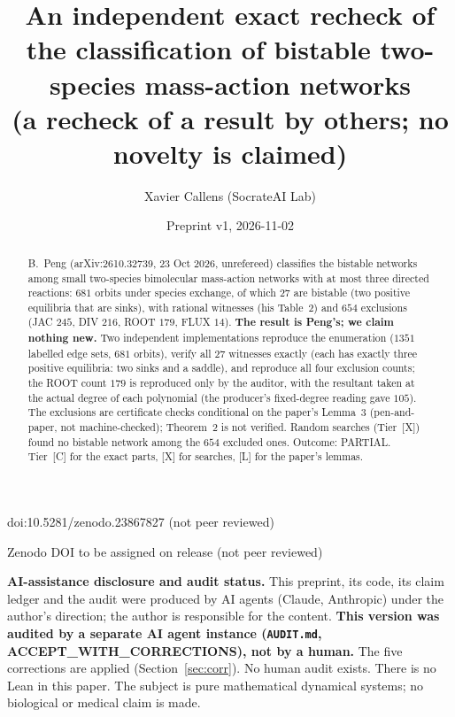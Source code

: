 \documentclass[10pt]{article}
\title{An independent exact recheck of the classification of bistable two-species mass-action networks\\
{\large (a recheck of a result by others; no novelty is claimed)}}
\author{Xavier Callens (SocrateAI Lab)}
\date{Preprint v1, 2026-11-02}
\newcommand{\tier}[1]{\textsf{[#1]}}
\newcommand{\tL}{\tier{L}}
\newcommand{\tC}{\tier{C}}
\newcommand{\tX}{\tier{X}}
\begin{document}
\maketitle
\begin{center}\small doi:10.5281/zenodo.23867827 \quad (not peer reviewed)\end{center}

\begin{center}\small Zenodo DOI to be assigned on release \quad (not peer reviewed)\end{center}

\noindent\textbf{AI-assistance disclosure and audit status.} This preprint, its code, its claim ledger and the audit were produced by AI agents (Claude, Anthropic) under the author's direction; the author is responsible for the content.
\textbf{This version was audited by a separate AI agent instance (\texttt{AUDIT.md}, ACCEPT\_WITH\_CORRECTIONS), not by a human.} The five corrections are applied (Section~\ref{sec:corr}). No human audit exists. There is no Lean in this paper. The subject is pure mathematical dynamical systems; no biological or medical claim is made.

\begin{abstract}
\noindent B.~Peng \cite{peng} (arXiv:2610.32739, 23 Oct 2026, unrefereed) classifies the bistable networks among small two-species bimolecular mass-action networks with at most three directed reactions: $681$ orbits under species exchange, of which $27$ are bistable (two positive equilibria that are sinks), with rational witnesses (his Table~2) and $654$ exclusions (JAC $245$, DIV $216$, ROOT $179$, FLUX $14$). \textbf{The result is Peng's; we claim nothing new.} Two independent implementations reproduce the enumeration ($1351$ labelled edge sets, $681$ orbits), verify all $27$ witnesses exactly (each has exactly three positive equilibria: two sinks and a saddle), and reproduce all four exclusion counts; the ROOT count $179$ is reproduced only by the auditor, with the resultant taken at the actual degree of each polynomial (the producer's fixed-degree reading gave $105$). The exclusions are certificate checks conditional on the paper's Lemma~3 (pen-and-paper, not machine-checked); Theorem~2 is not verified. Random searches (Tier~\tX) found no bistable network among the $654$ excluded ones. Outcome: PARTIAL. Tier~\tC{} for the exact parts, \tX{} for searches, \tL{} for the paper's lemmas.
\end{abstract}

\noindent{}
\end{document}
